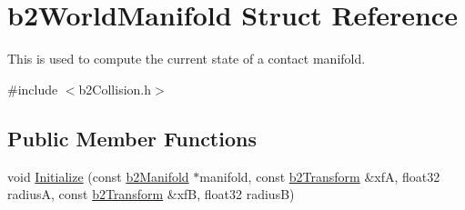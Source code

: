 \hypertarget{structb2_world_manifold}{}\section{b2\+World\+Manifold Struct Reference}
\label{structb2_world_manifold}


This is used to compute the current state of a contact manifold.  




{\ttfamily \#include $<$b2\+Collision.\+h$>$}

\subsection*{Public Member Functions}
\begin{DoxyCompactItemize}
\item 
void \hyperlink{structb2_world_manifold_a896dd7e7d4d6f6a5bc69e19fbd6871bd}{Initialize} (const \hyperlink{structb2_manifold}{b2\+Manifold} $\ast$manifold, const \hyperlink{structb2_transform}{b2\+Transform} \&xfA, float32 radiusA, const \hyperlink{structb2_transform}{b2\+Transform} \&xfB, float32 radiusB)
\end{DoxyCompactItemize}
